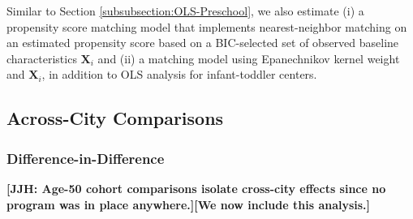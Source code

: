 Similar to Section \ref{subsubsection:OLS-Preschool}, we also estimate (i) a propensity score matching model that implements nearest-neighbor matching on an estimated propensity score based on a BIC-selected set of observed baseline characteristics $\boldsymbol{X}_i$ and (ii) a matching model using Epanechnikov kernel weight and $\boldsymbol{X}_i$, in addition to OLS analysis for infant-toddler centers. 



\subsection{Across-City Comparisons} \label{sec:across-city-analysis}
\subsubsection{Difference-in-Difference}  \label{subsubsection:DID}

\textbf{[JJH: Age-50 cohort comparisons isolate cross-city effects since no program was in place anywhere.][We now include this analysis.]}

